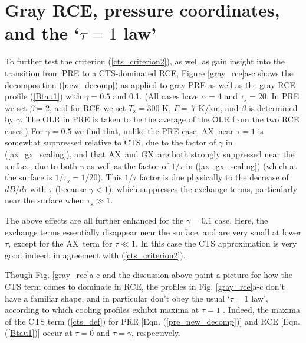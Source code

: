 \documentclass{ametsoc}
\newcommand{\eqnref}[1]{(\ref{#1})}
\newcommand{\Ts}{\ensuremath{T_\mathrm{s}}}
\newcommand{\taus}{\ensuremath{\tau_s}}
\newcommand{\AX}{\ensuremath{\mathrm{AX}}}
\newcommand{\GX}{\ensuremath{\mathrm{GX}}}
\newcommand{\CTS}{\ensuremath{\mathrm{CTS}}}
\begin{document}
\section{Gray RCE, pressure coordinates, and the `$\tau=1$ law'} \label{sec_gray_rce}
To further test the criterion \eqnref{cts_criterion2}, as well as gain insight into the transition from PRE to a CTS-dominated RCE, Figure \ref{gray_rce}a-c shows the decomposition \eqnref{new_decomp} as applied to gray PRE as well as the gray RCE profile \eqnref{Btau1} with $\gamma=0.5$ and 0.1. (All cases have $\alpha=4$ and $\taus=20$. In PRE we set $\beta=2$, and for RCE we set $\Ts = 300 $ K, $\Gamma=\ 7$ K/km, and $\beta$ is determined by $\gamma$. The OLR in PRE is taken to be the average of the OLR from the two RCE cases.) For $\gamma=0.5$ we find that, unlike the PRE case, \AX\ near $\tau=1$ is somewhat suppressed relative to \CTS, due to the factor of $\gamma$ in \eqnref{ax_gx_scaling}, and that \AX\ and \GX\ are both strongly suppressed near the surface, due to both $\gamma$ as well as the factor of $1/\tau$ in \eqnref{ax_gx_scaling} (which at the surface is $1/\taus = 1/20$). This $1/\tau$ factor is due physically to the decrease of $dB/d\tau$ with $\tau$ (because $\gamma<1$), which suppresses the exchange terms, particularly near the surface when $\taus \gg 1$.

The above effects are all further enhanced for the $\gamma=0.1$ case. Here, the exchange terms essentially disappear near the surface, and are very small at lower $\tau$, except for the \AX\ term for $\tau \ll 1$. In this case the CTS approximation is very good indeed, in agreement with \eqnref{cts_criterion2}.

Though Fig. \ref{gray_rce}a-c and the discussion above paint a picture for how the CTS term comes to dominate in RCE, the profiles in Fig. \ref{gray_rce}a-c don't have a familiar shape, and in particular don't obey the usual `$\tau=1$ law', according to which cooling profiles exhibit maxima at $\tau=1$  \citep[e.g.][]{huang2014,wallace2006,petty2006}. Indeed, the maxima of the CTS term \eqnref{cts_def} for PRE  [Eqn. \eqnref{pre_new_decomp}] and RCE [Eqn. \eqnref{Btau1}] occur at $\tau=0$ and $\tau=\gamma$, respectively. 
\end{document}
